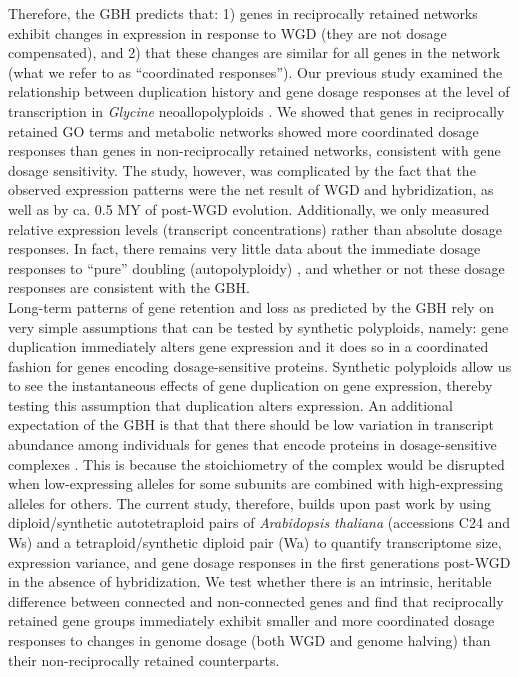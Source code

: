 \documentclass[11pt]{article}
\begin{document}
Therefore, the GBH predicts that: 1) genes in reciprocally retained networks exhibit changes in expression in response to WGD (they are not dosage compensated), and 2) that these changes are similar for all genes in the network (what we refer to as ``coordinated responses''). Our previous study examined the relationship between duplication history and gene dosage responses at the level of transcription in \textit{Glycine} neoallopolyploids \citep{coate2016}.
We showed that genes in reciprocally retained GO terms and metabolic networks showed more coordinated dosage responses than genes in non-reciprocally retained networks, consistent with gene dosage sensitivity.
The \cite{coate2016} study, however, was complicated by the fact that the observed expression patterns were the net result of WGD and hybridization, as well as by ca. 0.5 MY of post-WGD evolution.
Additionally, we only measured relative expression levels (transcript concentrations) rather than absolute dosage responses.
In fact, there remains very little data about the immediate dosage responses to ``pure'' doubling (autopolyploidy) \citep{spoelhof2017, visger2019}, and whether or not these dosage responses are consistent with the GBH.\\

Long-term patterns of gene retention and loss as predicted by the GBH rely on very simple assumptions that can be tested by synthetic polyploids, namely: gene duplication immediately alters gene expression and it does so in a coordinated fashion for genes encoding dosage-sensitive proteins.
Synthetic polyploids allow us to see the instantaneous effects of gene duplication on gene expression, thereby testing this assumption that duplication alters expression.
An additional expectation of the GBH is that that there should be low variation in transcript abundance among individuals for genes that encode proteins in dosage-sensitive complexes \citep{coate2016}. This is because the stoichiometry of the complex would be disrupted when low-expressing alleles for some subunits are combined with high-expressing alleles for others.
The current study, therefore, builds upon past work by using diploid/synthetic autotetraploid pairs of \textit{Arabidopsis thaliana} (accessions C24 and Ws) and a tetraploid/synthetic diploid pair (Wa) to quantify transcriptome size, expression variance, and gene dosage responses in the first generations post-WGD in the absence of hybridization.
We test whether there is an intrinsic, heritable difference between connected and non-connected genes and find that reciprocally retained gene groups immediately exhibit smaller and more coordinated dosage responses to changes in genome dosage (both WGD and genome halving) than their non-reciprocally retained counterparts.\\
\end{document}
